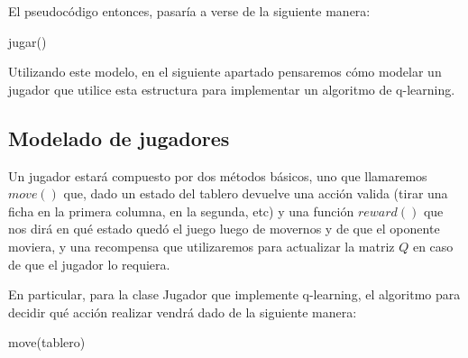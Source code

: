 El pseudocódigo entonces, pasaría a verse de la siguiente manera:
\pagebreak
\begin{algorithm}[h!]
\begin{algorithmic}[1]\parskip=1mm
 \caption{jugar()}
\end{algorithmic}
\end{algorithm}

Utilizando este modelo, en el siguiente apartado pensaremos cómo modelar un jugador que utilice esta estructura para implementar un algoritmo de q-learning.

\subsection{Modelado de jugadores}

Un jugador estará compuesto por dos métodos básicos, uno que llamaremos $move()$ que, dado un estado del tablero devuelve una acción valida (tirar una ficha en la primera columna, en la segunda, etc) y una función $reward()$ que nos dirá en qué estado quedó el juego luego de movernos y de que el oponente moviera, y una recompensa que utilizaremos para actualizar la matriz $Q$ en caso de que el jugador lo requiera.

En particular, para la clase Jugador que implemente q-learning, el algoritmo para decidir qué acción realizar vendrá dado de la siguiente manera:

\begin{algorithm}[h!]
\begin{algorithmic}[1]\parskip=1mm
 \caption{move(tablero)}
\end{algorithmic}
\end{algorithm}

